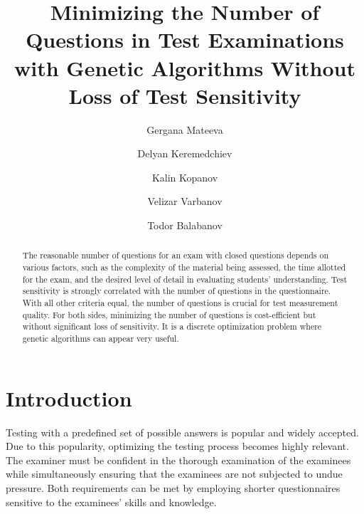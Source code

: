 \documentclass[aip,cp,amsmath,amssymb,reprint,]{revtex4-2}
\begin{document}
\title{Minimizing the Number of Questions in Test Examinations with Genetic Algorithms Without Loss of Test Sensitivity}

\author{Gergana Mateeva}
\author{Delyan Keremedchiev}
\author{Kalin Kopanov}
\author{Velizar Varbanov}
\author{Todor Balabanov}


\begin{abstract}
The reasonable number of questions for an exam with closed questions depends on various factors, such as the complexity of the material being assessed, the time allotted for the exam, and the desired level of detail in evaluating students' understanding. Test sensitivity is strongly correlated with the number of questions in the questionnaire. With all other criteria equal, the number of questions is crucial for test measurement quality. For both sides, minimizing the number of questions is cost-efficient but without significant loss of sensitivity. It is a discrete optimization problem where genetic algorithms can appear very useful.
\end{abstract}

\maketitle

\section{Introduction}

Testing with a predefined set of possible answers is popular and widely accepted. Due to this popularity, optimizing the testing process becomes highly relevant. The examiner must be confident in the thorough examination of the examinees while simultaneously ensuring that the examinees are not subjected to undue pressure. Both requirements can be met by employing shorter questionnaires sensitive to the examinees' skills and knowledge.
\end{document}
